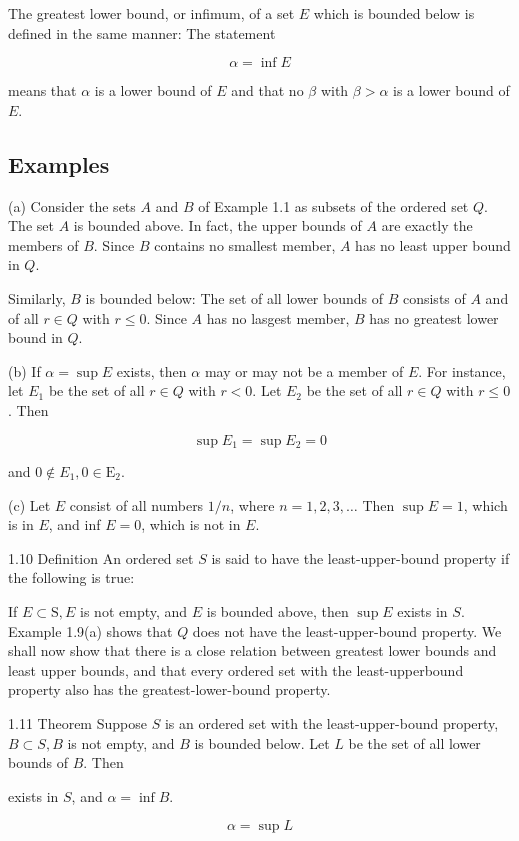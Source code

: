\documentclass[10pt]{article}
\begin{document}
The greatest lower bound, or infimum, of a set $E$ which is bounded below is defined in the same manner: The statement

$$
\alpha=\inf E
$$

means that $\alpha$ is a lower bound of $E$ and that no $\beta$ with $\beta>\alpha$ is a lower bound of $E$.

\subsection{Examples}
(a) Consider the sets $A$ and $B$ of Example 1.1 as subsets of the ordered set $Q$. The set $A$ is bounded above. In fact, the upper bounds of $A$ are exactly the members of $B$. Since $B$ contains no smallest member, $A$ has no least upper bound in $Q$.

Similarly, $B$ is bounded below: The set of all lower bounds of $B$ consists of $A$ and of all $r \in Q$ with $r \leq 0$. Since $A$ has no lasgest member, $B$ has no greatest lower bound in $Q$.

(b) If $\alpha=\sup E$ exists, then $\alpha$ may or may not be a member of $E$. For instance, let $E_{1}$ be the set of all $r \in Q$ with $r<0$. Let $E_{2}$ be the set of all $r \in Q$ with $r \leq 0$. Then

$$
\sup E_{1}=\sup E_{2}=0
$$

and $0 \notin E_{1}, 0 \in \mathrm{E}_{2}$.

(c) Let $E$ consist of all numbers $1 / n$, where $n=1,2,3, \ldots$ Then $\sup E=1$, which is in $E$, and inf $E=0$, which is not in $E$.

1.10 Definition An ordered set $S$ is said to have the least-upper-bound property if the following is true:

If $E \subset \mathrm{S}, E$ is not empty, and $E$ is bounded above, then $\sup E$ exists in $S$. Example 1.9(a) shows that $Q$ does not have the least-upper-bound property. We shall now show that there is a close relation between greatest lower bounds and least upper bounds, and that every ordered set with the least-upperbound property also has the greatest-lower-bound property.

1.11 Theorem Suppose $S$ is an ordered set with the least-upper-bound property, $B \subset S, B$ is not empty, and $B$ is bounded below. Let $L$ be the set of all lower bounds of $B$. Then

exists in $S$, and $\alpha=\inf B$.

$$
\alpha=\sup L
$$
\end{document}

